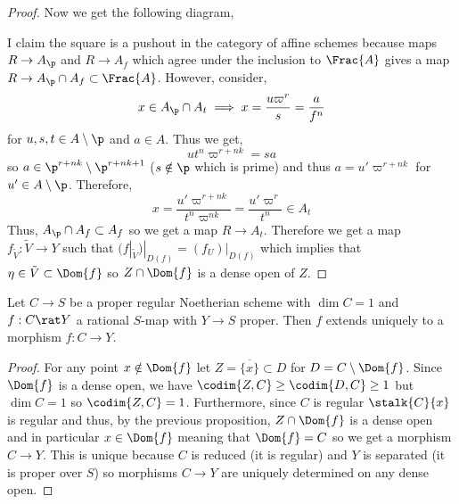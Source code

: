 \begin{proof}
Now we get the following diagram, 
\begin{center}
\end{center}
I claim the square is a pushout in the category of affine schemes because maps $R \to A_\p$ and $R \to A_f$ which agree under the inclusion to $\Frac{A}$ gives a map $R \to A_\p \cap A_f \subset \Frac{A}$. However, consider,
\[ x \in A_\p \cap A_t \implies x = \frac{u \varpi^r}{s} = \frac{a}{f^n} \]
for $u, s, t \in A \setminus \p$ and $a \in A$. Thus we get,
\[ u t^n \varpi^{r + nk} = s a \]
so $a \in \p^{r + nk} \setminus \p^{r + nk + 1}$ ($s \notin \p$ which is prime) and thus $a = u' \varpi^{r + nk}$ for $u' \in A \setminus \p$. Therefore,
\[ x = \frac{u' \varpi^{r + nk}}{t^n \varpi^{nk}} = \frac{u' \varpi^{r}}{t^n} \in A_t \]
Thus, $A_\p \cap A_f \subset A_f$ so we get a map $R \to A_t$. Therefore we get a map $f_{\tilde{V}} : \tilde{V} \to Y$ such that $(f|_{\tilde{V}})|_{D(f)} = (f_U)|_{D(f)}$ which implies that $\eta \in \tilde{V} \subset \Dom{f}$ so $Z \cap \Dom{f}$ is a dense open of $Z$. 
\end{proof}

\begin{prop}
Let $C \to S$ be a proper regular Noetherian scheme with $\dim{C} = 1$ and $f : C \rat Y$ a rational $S$-map with $Y \to S$ proper. Then $f$ extends uniquely to a morphism $f : C \to Y$. 
\end{prop}

\begin{proof}
For any point $x \notin \Dom{f}$ let $Z = \overline{\{ x \}} \subset D$ for $D = C \setminus \Dom{f}$. Since $\Dom{f}$ is a dense open, we have $\codim{Z, C} \ge \codim{D, C} \ge 1$ but $\dim{C} = 1$ so $\codim{Z, C} = 1$. Furthermore, since $C$ is regular $\stalk{C}{x}$ is regular and thus, by the previous proposition, $Z \cap \Dom{f}$ is a dense open and in particular $x \in \Dom{f}$ meaning that $\Dom{f} = C$ so we get a morphism $C \to Y$. This is unique because $C$ is reduced (it is regular) and $Y$ is separated (it is proper over $S$) so morphisms $C \to Y$ are uniquely determined on any dense open.
\end{proof}

